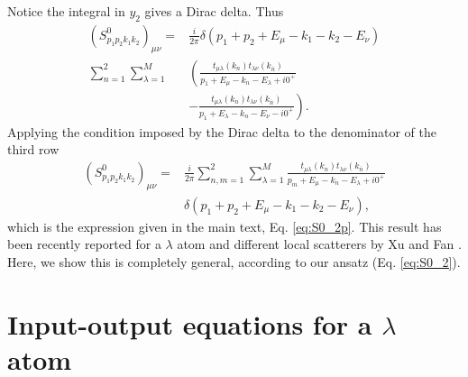 \documentclass[aps,pra,reprint,amsmath,amssymb]{revtex4-1}
\begin{document}
Notice the integral in $y_2$ gives a Dirac delta. Thus
\begin{align}
(S_{p_1p_2k_1k_2}^0)_{\mu\nu}=&\frac{i}{2\pi} \delta(p_1+p_2+E_\mu-k_1-k_2-E_\nu) \nonumber\\
\sum_{n=1}^2 \sum_{\lambda=1}^M& \left( \frac{t_{\mu\lambda}(k_n)t_{\lambda\nu}(k_{\overline{n}})}{p_1+E_\mu-k_n-E_\lambda+i0^+} \right. \nonumber\\
&\left. -\frac{t_{\mu\lambda}(k_n)t_{\lambda\nu}(k_{\overline{n}})}{p_1+E_\lambda-k_n-E_\nu-i0^+}\right).
\end{align}
Applying the condition imposed by the Dirac delta to the denominator of the third row
\begin{align}
(S_{p_1p_2k_1k_2}^0)_{\mu\nu}=  &\frac{i}{2\pi}\sum_{n,m=1}^2 \sum_{\lambda=1}^M  \frac{t_{\mu\lambda}(k_n) t_{\lambda\nu}(k_{\overline{n}})}{p_m+E_\mu -k_n -E_\lambda + i0^+}\nonumber\\
&\delta(p_1+p_2+E_\mu - k_1-k_2-E_\nu),
\end{align}
which is the expression given in the main text, Eq. \eqref{eq:S0_2p}. This result has been recently reported for a $\lambda$ atom and different local scatterers by Xu and Fan \cite{Xu2016}. Here, we show this is completely general, according to our ansatz (Eq. \eqref{eq:S0_2}).



\section{Input-output equations for a $\lambda$ atom}
\end{document}
